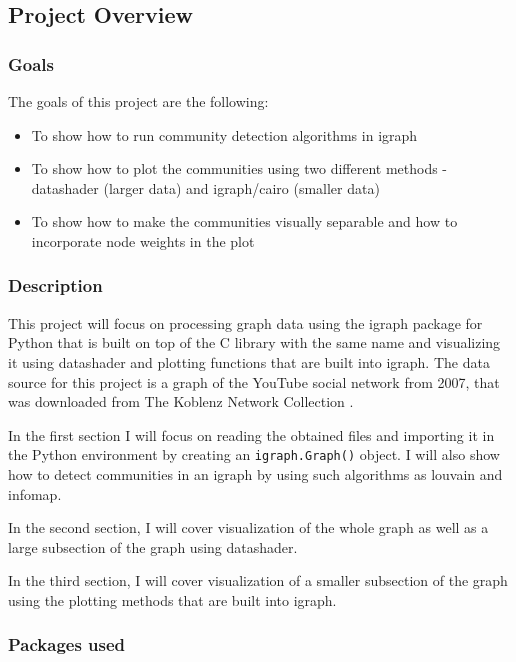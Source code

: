\documentclass[12pt, a4paper]{article}
\begin{document}
\subsection{Project Overview}
\subsubsection{Goals}
The goals of this project are the following:

\begin{itemize}
\item To show how to run community detection algorithms in igraph
\item To show how to plot the communities using two different methods - datashader  (larger data) and igraph/cairo (smaller data)
\item To show how to make the communities visually separable and how to incorporate node weights in the plot
\end{itemize}

\subsubsection{Description}
This project will focus on processing graph data using the igraph package for Python that is built on top of the C library with the same name \cite{csardi2006igraph} and visualizing it using datashader \cite{ref_datashader} and plotting functions that are built into igraph. The data source for this project is a graph of the YouTube social network from 2007, that was downloaded from The Koblenz Network Collection \cite{youtube_source}.

In the first section I will focus on reading the obtained files and importing it in the Python environment by creating an \texttt{igraph.Graph()} object. I will also show how to detect communities in an igraph by using such algorithms as louvain\cite{blondel2011louvain} and infomap\cite{rosvall2008maps_infomap}.

In the second section, I will cover visualization of the whole graph as well as a large subsection of the graph using datashader.

In the third section, I will cover visualization of a smaller subsection of the graph using the plotting methods that are built into igraph.

\subsubsection{Packages used}
\end{document}
